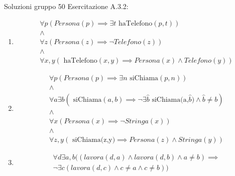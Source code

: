 \documentclass{article}
\begin{document}
    Soluzioni gruppo 50 Esercitazione A.3.2:

    \begin{enumerate}
        \item \begin{equation}
            \begin{gathered}
                \forall p (Persona(p) \implies \exists t \text{ haTelefono}(p,t))
                \\\land\\ \forall z (Persona(z) \implies \neg Telefono(z))
                \\\land\\ \forall x,y  (\text{ haTelefono}(x,y) \implies Persona(x) \land Telefono(y))
            \end{gathered}
        \end{equation}
        \item \begin{equation}
            \begin{gathered}
                \forall p (Persona(p) \implies \exists n \text{ siChiama}(p,n))
                \\\land\\
                \forall a \exists b (\text{ siChiama}(a,b) \implies \neg \exists \hat{b} \text{ siChiama(a,$\hat{b}$)} \land \hat{b}\not =b)
                \\\land\\
                \forall x (Persona(x) \implies \neg Stringa(x))
                \\\land\\
                \forall z,y (\text{ siChiama(z,y)} \implies Persona(z) \land Stringa(y))
            \end{gathered}
        \end{equation}

        \item \begin{equation}
            \begin{gathered}
                \forall d \exists a,b ((lavora(d,a) \land lavora(d,b) \land a\not =b)\implies\\
                \neg \exists c (lavora(d,c) \land c\not =a \land c\not =b))
            \end{gathered}
        \end{equation}


\end{enumerate}
\end{document}
